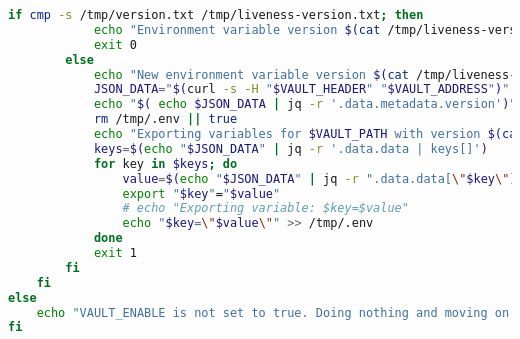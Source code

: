 \begin{lstlisting}[language=bash, caption={liveness probe bash script}, label={lst:your_script}]
        if cmp -s /tmp/version.txt /tmp/liveness-version.txt; then 
            echo "Environment variable version $(cat /tmp/liveness-version.txt) is up to date"
            exit 0
        else
            echo "New environment variable version $(cat /tmp/liveness-version.txt) detected"
            JSON_DATA="$(curl -s -H "$VAULT_HEADER" "$VAULT_ADDRESS")"
            echo "$( echo $JSON_DATA | jq -r '.data.metadata.version')" > /tmp/version.txt
            rm /tmp/.env || true
            echo "Exporting variables for $VAULT_PATH with version $(cat /tmp/version.txt)"
            keys=$(echo "$JSON_DATA" | jq -r '.data.data | keys[]')
            for key in $keys; do
                value=$(echo "$JSON_DATA" | jq -r ".data.data[\"$key\"]")
                export "$key"="$value"
                # echo "Exporting variable: $key=$value"
                echo "$key=\"$value\"" >> /tmp/.env
            done
            exit 1
        fi
    fi
else
    echo "VAULT_ENABLE is not set to true. Doing nothing and moving on as expected."
fi
\end{lstlisting}